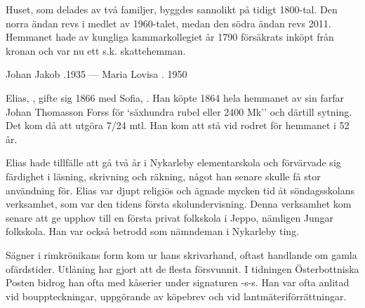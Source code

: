 Huset, som delades av två familjer, byggdes sannolikt på tidigt 1800-tal. Den norra ändan revs i medlet av 1960-talet, medan den södra ändan revs 2011. Hemmanet hade av kungliga kammarkollegiet år 1790 försäkrats inköpt från kronan och var nu ett s.k. skattehemman.

Johan Jakob .1935  ---  Maria Lovisa . 1950


Elias, , gifte sig 1866 med Sofia, . Han  köpte 1864 hela hemmanet  av sin farfar Johan Thomasson Forss för `säxhundra rubel eller 2400 Mk'' och därtill sytning. Det kom då att utgöra 7/24 mtl. Han kom att stå vid rodret för hemmanet  i 52 år.

Elias hade tillfälle att gå två år i Nykarleby elementarskola och förvärvade sig färdighet i läsning, skrivning och räkning, något han senare skulle få stor användning för. Elias var djupt religiös och ägnade mycken tid åt söndagsskolans verksamhet, som var den tidens första skolundervisning. Denna verksamhet kom senare att ge upphov till en första privat folkskola i Jeppo, nämligen Jungar folkskola. Han var också betrodd som nämndeman i Nykarleby ting.

Sägner i rimkrönikans form kom ur hans skrivarhand, oftast handlande om gamla ofärdstider. Utlåning har gjort att de flesta försvunnit. I tidningen Österbottniska Posten bidrog han ofta med kåserier under signaturen  -s-s. Han var ofta anlitad vid bouppteckningar, uppgörande av köpebrev och vid lantmäteriförrättningar.
\begin{jhchildren}
  \item {}
  \item {}
  \item {}
  \item {}
  \item {}
  \item {}
  \item {}
  \item {}
  \item {}
  \item {}
\end{jhchildren}

